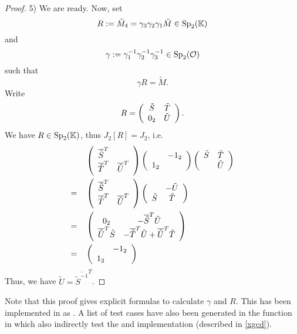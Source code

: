 \begin{lemma}[$solveR$]
\begin{proof}
5) We are ready. Now, set
\[ R := \tilde{M}_4 = \gamma_3 \gamma_2 \gamma_1 \tilde{M} \in \operatorname{Sp}_2(\mathbb{K}) \]
and
\[ \gamma :=  \gamma_1^{-1} \gamma_2^{-1} \gamma_3^{-1} \in \operatorname{Sp}_2(\mathcal{O}) \]
such that
\[ \gamma R = \tilde{M} . \]
Write
\[ R = \left( \begin{array}{cc} \tilde{S} & \tilde{T} \\ 0_2 & \tilde{U} \end{array} \right) . \]
We have $R \in \operatorname{Sp}_2(\mathbb{K})$, thus $J_2[R] = J_2$, i.e.
\begin{align*}
&\SimpleMatrix{\overline{\tilde{S}}^T}{}{\overline{\tilde{T}}^T}{\overline{\tilde{U}}^T}
\SimpleMatrix{}{-1_2}{1_2}{}
\SimpleMatrix{\tilde{S}}{\tilde{T}}{}{\tilde{U}} \\
=\quad & \SimpleMatrix{\overline{\tilde{S}}^T}{}{\overline{\tilde{T}}^T}{\overline{\tilde{U}}^T}
\SimpleMatrix{}{-\tilde{U}}{\tilde{S}}{\tilde{T}} \\
=\quad & \SimpleMatrix{0_2}{-\overline{\tilde{S}}^T \tilde{U}}{\overline{\tilde{U}}^T \tilde{S}}{%
-\overline{\tilde{T}}^T \tilde{U} + \overline{\tilde{U}}^T \tilde{T} } \\
=\quad & \SimpleMatrix{}{-1_2}{1_2}{}
\end{align*}
Thus, we have $\tilde{U} = \overline{\tilde{S}^{-1}}^T$.
\end{proof}
\end{lemma}
Note that this proof gives explicit formulas to calculate $\gamma$ and $R$. This has been implemented in  as . A list of test cases have also been generated in the function  in  which also indirectly test the  and  implementation (described in \cref{xgcd}).

